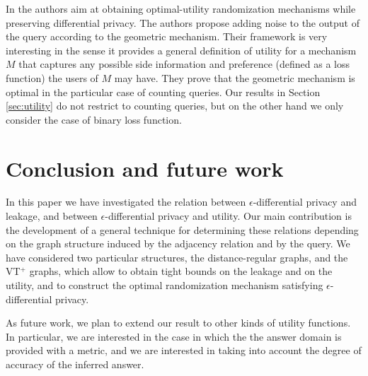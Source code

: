\documentclass{llncs}
\begin{document}
In \cite{Ghosh:09:STC} the authors aim at obtaining optimal-utility randomization mechanisms while preserving differential privacy. The authors propose adding noise to the output of the query according to the geometric mechanism. Their framework is very interesting in the sense it provides a general definition of utility for a mechanism $M$ that captures any possible side information and preference (defined as a loss function) the users of $M$ may have. They prove that the geometric mechanism is optimal in the particular case of counting queries. Our results in Section \ref{sec:utility} do not restrict to counting queries, but on the other hand we only consider the case of binary loss function.


\section{Conclusion and future work}
In this paper we have investigated the relation between $\epsilon$-differential privacy and leakage, and between $\epsilon$-differential privacy and utility.
 Our main contribution is the development of a general technique for determining these relations  depending on the graph structure induced by the adjacency relation and by the query.
 We have considered two particular structures, the distance-regular graphs, and the VT$^+$ graphs, which allow to obtain tight bounds on the leakage and on the utility, and to construct the optimal randomization mechanism satisfying $\epsilon$-differential privacy. 
 

As future work, we plan to extend our result to other kinds of utility functions. In particular, we are interested in the case in which the the answer domain is provided with a metric, and we are interested in taking into account  the degree of accuracy of the inferred answer.  



\end{document}

